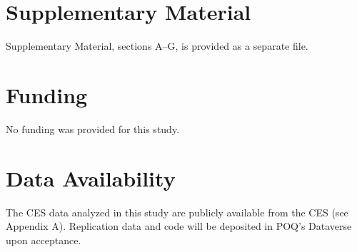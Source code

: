 \documentclass[12pt]{article}
\begin{document}
\section*{Supplementary Material}
Supplementary Material, sections A--G, is provided as a separate file.

\section*{Funding}
No funding was provided for this study.

\section*{Data Availability}
The CES data analyzed in this study are publicly available from the CES (see Appendix A). Replication data and code will be deposited in POQ's Dataverse upon acceptance.

\nocite{jaro_advances_1989,kullback_information_1959}

\begin{singlespace}
\setlength{\bibitemsep}{0pt}
\printbibliography
\end{singlespace}

\end{document}
